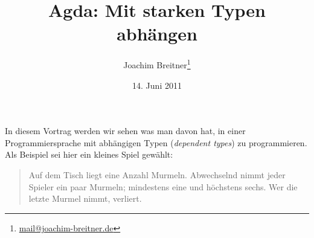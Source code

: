 \documentclass[12pt,parskip=half,headings=normal,abstract]{scrartcl}
\author{Joachim Breitner\footnote{\href{mailto:mail@joachim-breitner.de}{mail@joachim-breitner.de}}}
\title{Agda: Mit starken Typen abhängen}
\date{14. Juni 2011}
\begin{document}
\maketitle

In diesem Vortrag werden wir sehen was man davon hat, in einer Programmiersprache mit abhängigen Typen (\emph{dependent types}) zu programmieren. Als Beispiel sei hier ein kleines Spiel gewählt:

\begin{quote}
Auf dem Tisch liegt eine Anzahl Murmeln. Abwechselnd nimmt jeder Spieler ein paar Murmeln; mindestens eine und höchstens sechs. Wer die letzte Murmel nimmt, verliert.
\end{quote}






\end{document}
